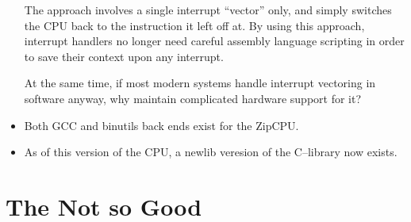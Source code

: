 \documentclass{gqtekspec}
\begin{document}
\begin{itemize}
	The approach involves a single interrupt ``vector'' only, and simply
	switches the CPU back to the instruction it left off at.  By using
	this approach, interrupt handlers no longer need careful assembly
	language scripting in order to save their context upon any interrupt.

	At the same time, if most modern systems handle interrupt vectoring in
	software anyway, why maintain complicated hardware support for it?

\item Both GCC and binutils back ends exist for the ZipCPU.
\item As of this version of the CPU, a newlib veresion of the C--library
	now exists.
\end{itemize}

\section{The Not so Good}
\end{document}
